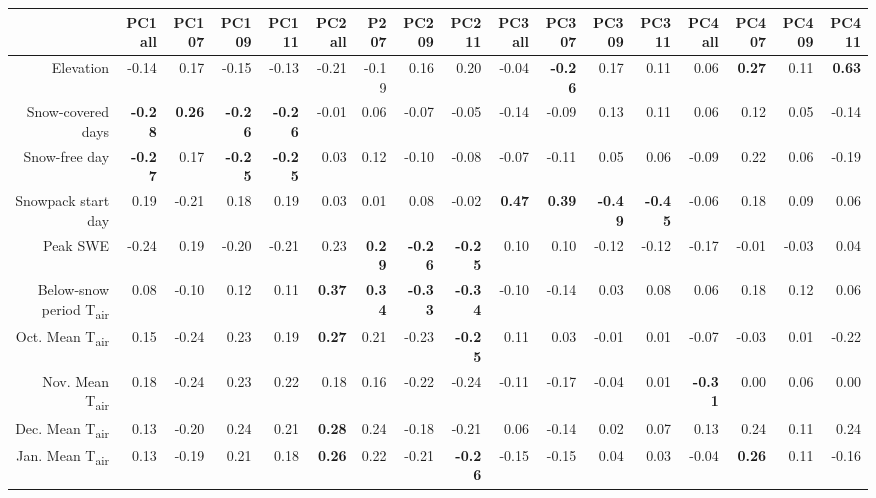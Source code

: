\begin{table}[ht]
\centering
\begin{tabular}{rrrrrrrrrrrrrrrrr}
  \hline
 & PC1all & PC107 & PC109 & PC111 & PC2all & P207 & PC209 & PC211 & PC3all & PC307 & PC309 & PC311 & PC4all & PC407 & PC409 & PC411 \\ 
  \hline
Elevation & -0.14 & 0.17 & -0.15 & -0.13 & -0.21 & -0.19 & 0.16 & 0.20 & -0.04 & \textbf{ -0.26 } & 0.17 & 0.11 & 0.06 & \textbf{ 0.27 } & 0.11 & \textbf{ 0.63 } \\ 
  Snow-covered days\tnote{a} & \textbf{ -0.28 } & \textbf{ 0.26 } & \textbf{ -0.26 } & \textbf{ -0.26 } & -0.01 & 0.06 & -0.07 & -0.05 & -0.14 & -0.09 & 0.13 & 0.11 & 0.06 & 0.12 & 0.05 & -0.14 \\ 
  Snow-free day & \textbf{ -0.27 } & 0.17 & \textbf{ -0.25 } & \textbf{ -0.25 } & 0.03 & 0.12 & -0.10 & -0.08 & -0.07 & -0.11 & 0.05 & 0.06 & -0.09 & 0.22 & 0.06 & -0.19 \\ 
  Snowpack start day & 0.19 & -0.21 & 0.18 & 0.19 & 0.03 & 0.01 & 0.08 & -0.02 & \textbf{ 0.47 } & \textbf{ 0.39 } & \textbf{ -0.49 } & \textbf{ -0.45 } & -0.06 & 0.18 & 0.09 & 0.06 \\ 
  Peak SWE & -0.24 & 0.19 & -0.20 & -0.21 & 0.23 & \textbf{ 0.29 } & \textbf{ -0.26 } & \textbf{ -0.25 } & 0.10 & 0.10 & -0.12 & -0.12 & -0.17 & -0.01 & -0.03 & 0.04 \\ 
  Below-snow period T\textsubscript{air}\tnote{b} & 0.08 & -0.10 & 0.12 & 0.11 & \textbf{ 0.37 } & \textbf{ 0.34 } & \textbf{ -0.33 } & \textbf{ -0.34 } & -0.10 & -0.14 & 0.03 & 0.08 & 0.06 & 0.18 & 0.12 & 0.06 \\ 
  Oct. Mean T\textsubscript{air} & 0.15 & -0.24 & 0.23 & 0.19 & \textbf{ 0.27 } & 0.21 & -0.23 & \textbf{ -0.25 } & 0.11 & 0.03 & -0.01 & 0.01 & -0.07 & -0.03 & 0.01 & -0.22 \\ 
  Nov. Mean T\textsubscript{air} & 0.18 & -0.24 & 0.23 & 0.22 & 0.18 & 0.16 & -0.22 & -0.24 & -0.11 & -0.17 & -0.04 & 0.01 & \textbf{ -0.31 } & 0.00 & 0.06 & 0.00 \\ 
  Dec. Mean T\textsubscript{air} & 0.13 & -0.20 & 0.24 & 0.21 & \textbf{ 0.28 } & 0.24 & -0.18 & -0.21 & 0.06 & -0.14 & 0.02 & 0.07 & 0.13 & 0.24 & 0.11 & 0.24 \\ 
  Jan. Mean T\textsubscript{air} & 0.13 & -0.19 & 0.21 & 0.18 & \textbf{ 0.26 } & 0.22 & -0.21 & \textbf{ -0.26 } & -0.15 & -0.15 & 0.04 & 0.03 & -0.04 & \textbf{ 0.26 } & 0.11 & -0.16 \\ 

\end{tabular}
\end{table}
